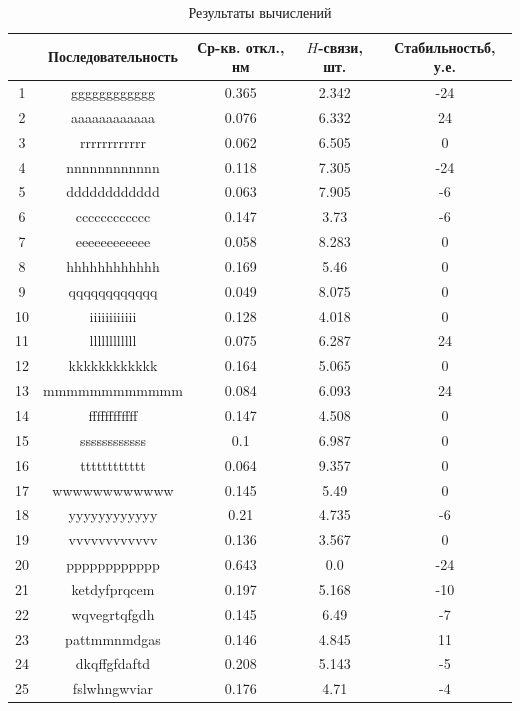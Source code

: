 \documentclass[
11pt,%
tightenlines,%
twoside,%
onecolumn,%
nofloats,%
nobibnotes,%
nofootinbib,%
superscriptaddress,%
noshowpacs,%
centertags]%
{revtex4}
\begin{document}
\begin{table}[h]
	\begin{tabular}{|c|c|c|c|c|}
		\hline
		 & Последовательность & Ср-кв. откл., нм & $H$-связи, шт. & Стабильностьб, у.е. \\ \hline
		1 & gggggggggggg & 0.365 & 2.342 & -24 \\ \hline 
		2 & aaaaaaaaaaaa & 0.076 & 6.332 & 24 \\ \hline 
		3 & rrrrrrrrrrrr & 0.062 & 6.505 & 0 \\ \hline 
		4 & nnnnnnnnnnnn & 0.118 & 7.305 & -24 \\ \hline 
		5 & dddddddddddd & 0.063 & 7.905 & -6 \\ \hline 
		6 & cccccccccccc & 0.147 & 3.73 & -6 \\ \hline 
		7 & eeeeeeeeeeee & 0.058 & 8.283 & 0 \\ \hline 
		8 & hhhhhhhhhhhh & 0.169 & 5.46 & 0 \\ \hline 
		9 & qqqqqqqqqqqq & 0.049 & 8.075 & 0 \\ \hline 
		10 & iiiiiiiiiiii & 0.128 & 4.018 & 0 \\ \hline 
		11 & llllllllllll & 0.075 & 6.287 & 24 \\ \hline 
		12 & kkkkkkkkkkkk & 0.164 & 5.065 & 0 \\ \hline 
		13 & mmmmmmmmmmmm & 0.084 & 6.093 & 24 \\ \hline 
		14 & ffffffffffff & 0.147 & 4.508 & 0 \\ \hline 
		15 & ssssssssssss & 0.1 & 6.987 & 0 \\ \hline 
		16 & tttttttttttt & 0.064 & 9.357 & 0 \\ \hline 
		17 & wwwwwwwwwwww & 0.145 & 5.49 & 0 \\ \hline 
		18 & yyyyyyyyyyyy & 0.21 & 4.735 & -6 \\ \hline 
		19 & vvvvvvvvvvvv & 0.136 & 3.567 & 0 \\ \hline 
		20 & pppppppppppp & 0.643 & 0.0 & -24 \\ \hline 
		21 & ketdyfprqcem & 0.197 & 5.168 & -10 \\ \hline 
		22 & wqvegrtqfgdh & 0.145 & 6.49 & -7 \\ \hline 
		23 & pattmmnmdgas & 0.146 & 4.845 & 11 \\ \hline 
		24 & dkqffgfdaftd & 0.208 & 5.143 & -5 \\ \hline 
		25 & fslwhngwviar & 0.176 & 4.71 & -4 \\ \hline 

	\end{tabular}
	\caption{Результаты вычислений}
\end{table}
\end{document}
